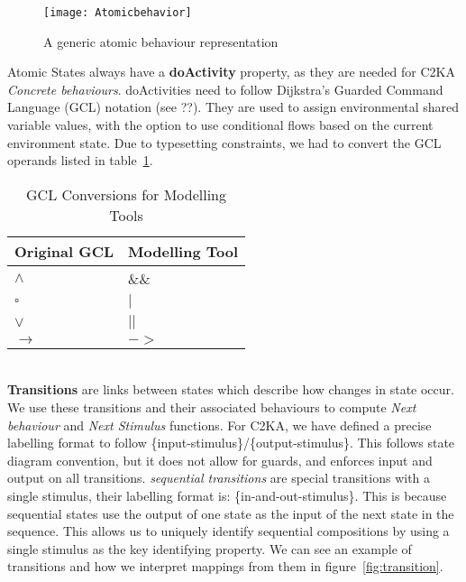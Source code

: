 \begin{figure}[h]
    \centering
    \texttt{[image: Atomicbehavior]}
    \caption{A generic atomic behaviour representation}
    \label{fig:atomicbehaviour}
\end{figure}

Atomic States always have a \textbf{doActivity} property,
as they are needed for C2KA \textit{Concrete behaviours}.
doActivities need to follow Dijkstra's Guarded Command Language (GCL) notation (see ??). %
They are used to assign environmental shared variable values,
with the option to use conditional flows based on the current environment state.
Due to typesetting constraints, we had to convert the GCL operands listed in table~\ref{tab:gcl-equivalence}.
\begin{table}[htbp]
      \centering
      \caption{GCL Conversions for Modelling Tools}\label{tab:gcl-equivalence}
      \begin{tabular}{| l | l |}
          \hline
          \textbf{Original GCL} & \textbf{Modelling Tool} \\
          \hline
          $\land$ & \&\& \\ \hline
          $\square$ & $|$ \\ \hline
          $\lor$ & $||$ \\ \hline
          $\rightarrow$ & $->$ \\ \hline
      \end{tabular}
\end{table}
\\

\textbf{Transitions} are links between states which describe how changes in state occur.
We use these transitions and their associated behaviours to compute \textit{Next behaviour} and \textit{Next Stimulus} functions.
For C2KA, we have defined a precise labelling format to follow \{input-stimulus\}/\{output-stimulus\}.
This follows state diagram convention, but it does not allow for guards,
and enforces input and output on all transitions.
\textit{sequential transitions} are special transitions with a single stimulus, their labelling format is: \{in-and-out-stimulus\}.
This is because sequential states use the output of one state as the input of the next state in the sequence.
This allows us to uniquely identify sequential compositions by using a single stimulus as the key identifying property.
We can see an example of transitions and how we interpret mappings from them in figure~\ref{fig:transition}.

